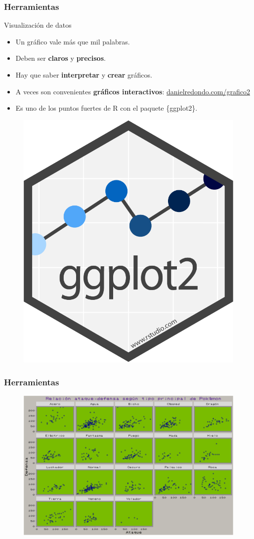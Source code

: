 \documentclass{beamer}
\begin{document}
\begin{frame}\frametitle{Herramientas}
	\begin{block}{Visualización de datos}
		\begin{itemize}
			\item Un gráfico vale más que mil palabras.
			\item Deben ser \textbf{claros} y \textbf{precisos}.
			\item Hay que saber \textbf{interpretar} y \textbf{crear} gráficos.
			\item A veces son convenientes \textbf{gráficos interactivos}: \url{danielredondo.com/grafico2}
			\item Es uno de los puntos fuertes de R con el paquete  \{ggplot2\}.
		\end{itemize}
		\begin{figure}
			\centering
			\includegraphics[width=.20\textwidth]{images/ggplot2.png}
		\end{figure}
	\end{block}
\end{frame}
\begin{frame}\frametitle{Herramientas}
	\begin{figure}
		\centering
		\includegraphics[width=.95\textwidth]{images/4.png}
	\end{figure}
\end{frame}
\end{document}
